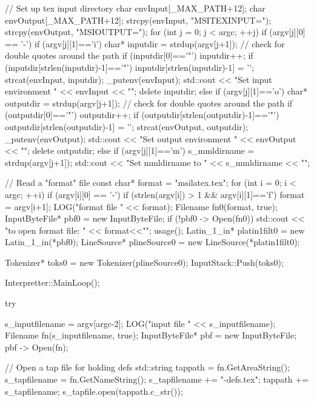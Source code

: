 {{{{{{{{{{{{{   // Set up tex input directory
   char envInput[_MAX_PATH+12];
   char envOutput[_MAX_PATH+12];
   strcpy(envInput, "MSITEXINPUT=");
   strcpy(envOutput, "MSIOUTPUT=");
   for (int j = 0; j < argc; ++j)
   {
      if (argv[j][0] == '-')
      {
        if (argv[j][1]=='i')
        {
         char* inputdir = strdup(argv[j+1]);
         // check for double quotes around the path
         if (inputdir[0]=='"') inputdir++;
         if (inputdir[strlen(inputdir)-1]=='"')
            inputdir[strlen(inputdir)-1] = '\0';
         strcat(envInput, inputdir);
         _putenv(envInput);
         std::cout << "Set input environment " << envInput << "\n";
         delete inputdir;
        }
        else if (argv[j][1]=='o')
        {
          char* outputdir = strdup(argv[j+1]);
          // check for double quotes around the path
          if (outputdir[0]=='"') outputdir++;
          if (outputdir[strlen(outputdir)-1]=='"')
           outputdir[strlen(outputdir)-1] = '\0';
          strcat(envOutput, outputdir);
          _putenv(envOutput);
          std::cout << "Set output environment " << envOutput << "\n";
          delete outputdir;
        }
        else if (argv[j][1]=='m')
        {
          s_mmldirname = strdup(argv[j+1]);
          std::cout << "Set mmldirname to " << s_mmldirname << "\n";
        }
      }
   }

   // Read a "format" file
   const char* format = "msilatex.tex";
   for (int i = 0; i < argc; ++i){
      if (argv[i][0] == '-'){
         if (strlen(argv[i]) > 1 && argv[i][1]=='f'){
           format = argv[i+1];
         }
      }
   }
   LOG("\nReading format file " << format);
   Filename fn0(format, true);
   InputByteFile* pbf0 = new InputByteFile;
   if (!pbf0 -> Open(fn0)){
      std::cout << "\nFailed to open format file: " << format<<"\n";
      usage();
   }
   Latin_1_in*  platin1filt0 = new Latin_1_in(*pbf0);
   LineSource* plineSource0 = new LineSource(*platin1filt0);

   Tokenizer* toks0 = new Tokenizer(plineSource0);
   InputStack::Push(toks0);

   Interpretter::MainLoop();

   try{
      s_inputfilename = argv[argc-2];
      LOG("\nReading input file " << s_inputfilename);
      Filename fn(s_inputfilename, true);
      InputByteFile* pbf = new InputByteFile;
      pbf -> Open(fn);

      // Open a tap file for holding defs
      std::string tappath = fn.GetAreaString();
      s_tapfilename = fn.GetNameString();
      s_tapfilename += "-defs.tex";
      tappath += s_tapfilename;
      s_tapfile.open(tappath.c_str());

}}}}}}}}}}}}}}
